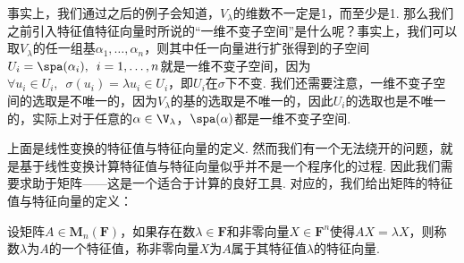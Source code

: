 事实上，我们通过之后的例子会知道，$V_\lambda$的维数不一定是1，而至少是1. 那么我们之前引入特征值特征向量时所说的``一维不变子空间''是什么呢？事实上，我们可以取$V_\lambda$的任一组基$\alpha_1,\ldots,\alpha_n$，则其中任一向量进行扩张得到的子空间$U_i=\spa(\alpha_i),\enspace i=1,\ldots,n$就是一维不变子空间，因为$\forall u_i\in U_i,\enspace \sigma(u_i)=\lambda u_i\in U_i$，即$U_i$在$\sigma$下不变. 我们还需要注意，一维不变子空间的选取是不唯一的，因为$V_\lambda$的基的选取是不唯一的，因此$U_i$的选取也是不唯一的，实际上对于任意的$\alpha\in\V_{\lambda}$，$\spa(\alpha)$都是一维不变子空间.

上面是线性变换的特征值与特征向量的定义. 然而我们有一个无法绕开的问题，就是基于线性变换计算特征值与特征向量似乎并不是一个程序化的过程. 因此我们需要求助于矩阵——这是一个适合于计算的良好工具. 对应的，我们给出矩阵的特征值与特征向量的定义：
\begin{definition}{}{}
    设矩阵$A\in \mathbf{M}_n(\mathbf{F})$，如果存在数$\lambda\in\mathbf{F}$和非零向量$X\in\mathbf{F}^n$使得$AX=\lambda X$，则称数$\lambda$为$A$的一个特征值，称非零向量$X$为$A$属于其特征值$\lambda$的特征向量.
\end{definition}


